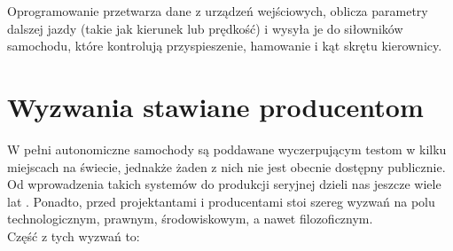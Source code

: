 Oprogramowanie przetwarza dane z urządzeń wejściowych, oblicza parametry dalszej jazdy (takie jak kierunek lub prędkość) i wysyła je do siłowników samochodu, które kontrolują przyspieszenie, hamowanie i kąt skrętu kierownicy.

\section{Wyzwania stawiane producentom}
\label{ChallengesOverview}
W pełni autonomiczne samochody są poddawane wyczerpującym testom w kilku miejscach na świecie, jednakże żaden z nich nie jest obecnie dostępny publicznie. Od wprowadzenia takich systemów do produkcji seryjnej dzieli nas jeszcze wiele lat \cite{level5Cars:predictions}. Ponadto, przed projektantami i producentami stoi szereg wyzwań na polu technologicznym, prawnym, środowiskowym, a nawet filozoficznym. \\
Część z tych wyzwań to:
